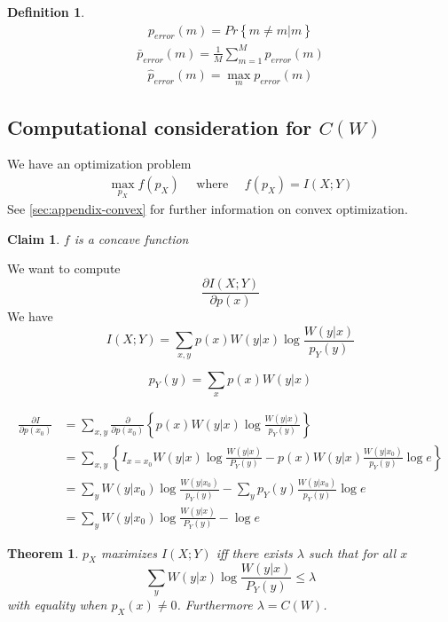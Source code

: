 \documentclass[twoside]{article}
\newtheorem{theorem}{Theorem}[section]
\newtheorem{claim}{Claim}[section]
\newtheorem{definition}{Definition}[section]
\theoremstyle{definition} %
\renewcommand{\Pr}[1]{Pr\left\{#1\right\}}
\begin{document}
\begin{definition}
  \begin{align*}
    p_{error}(m) = \Pr{\hat{m} \neq m | m}
  \end{align*}
  \begin{align*}
    \bar{p}_{error}(m) = \frac{1}{M} \sum_{m=1}^M p_{error}(m)
  \end{align*}
  \begin{align*}
    \hat{p}_{error}(m) = \max_{m} p_{error}(m)
  \end{align*}
\end{definition}



\subsection{Computational consideration for $C(W)$}
We have an optimization problem
  \begin{align*}
    \max_{p_X} f(p_X) \quad \text{ where } \quad f(p_X) = I(X ; Y)
  \end{align*}
See \cref{sec:appendix-convex} for further information on convex optimization.
  \begin{claim}
    $f$ is a concave function
  \end{claim}






We want to compute
\[
  \frac {\partial  I(X;Y)} {\partial p (x)}
\]
We have
\[
  I(X;Y) = \sum_{x,y} p(x) W(y|x) \log \frac {W(y|x)} {p_Y(y)}
\]

\[
  p_Y(y) = \sum_x p(x) W(y|x)
\]

\begin{align*}
  \frac {\partial I} {\partial p(x_0)}
  &= \sum_{x,y} \frac \partial {\partial p(x_0)}
  \left\{ p(x) W(y|x) \log \frac {W(y|x)} {p_Y(y)} \right\}\\
  &= \sum_{x,y} \left\{ I_{x=x_0} W(y|x)  \log \frac {W(y|x)} {P_Y(y)} -
    p(x)W(y|x) \frac {W(y|x_0)}{p_Y(y)} \log e \right\}\\
  &= \sum_y W(y|x_0) \log \frac {W(y|x_0)}{p_Y(y)} - \sum_y p_Y(y) \frac {W(y|x_0)}{p_Y(y)} \log e\\
  &= \sum_y W(y|x_0) \log \frac {W(y|x)} {P_Y(y)} - \log e
\end{align*}

\begin{theorem}
  \label{th:1000}
  $p_X$ maximizes $I(X;Y)$ iff there exists $\lambda$ such that for all $x$
  \[
    \sum_y W(y|x) \log \frac {W(y|x)} {P_Y(y)} \leq \lambda
  \]
  with equality when $p_X(x) \not= 0$. Furthermore $\lambda = C(W)$.
\end{theorem}
\end{document}
